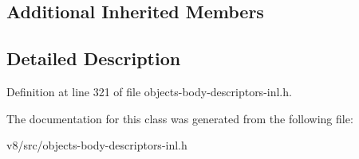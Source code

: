 \subsection*{Additional Inherited Members}


\subsection{Detailed Description}


Definition at line 321 of file objects-\/body-\/descriptors-\/inl.\+h.



The documentation for this class was generated from the following file\+:\begin{DoxyCompactItemize}
\item 
v8/src/objects-\/body-\/descriptors-\/inl.\+h\end{DoxyCompactItemize}
